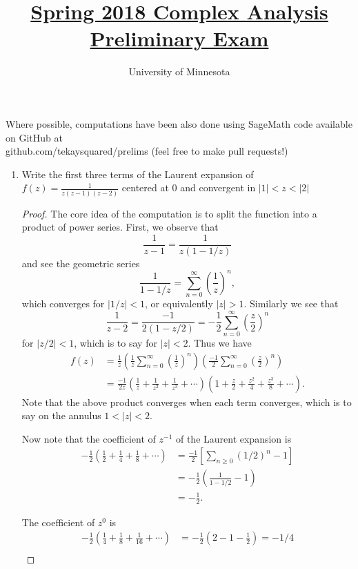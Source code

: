 \documentclass{article}
\title{\href{https://math.umn.edu/sites/math.umn.edu/files/exams/complexs18.pdf}{Spring 2018 Complex Analysis Preliminary Exam}}
\author{University of Minnesota}
\date{}
\begin{document}
\maketitle

Where possible, computations have been also done using SageMath code available on GitHub at \\ github.com/tekaysquared/prelims (feel free to make pull requests!)

\begin{enumerate}
	
	\item Write the first three terms of the Laurent expansion of $\displaystyle f(z) = \frac{1}{z(z-1)(z-2)}$ centered at $0$ and convergent in $|1| < z < |2|$
	
	\begin{proof}
		The core idea of the computation is to split the function into a product of power series.
		First, we observe that 
		\[ \frac{1}{z-1} = \frac{1}{z(1-1/z)}\] 
		and see the geometric series 
		\[ \frac{1}{1-1/z} = \sum_{n=0}^\infty \left( \frac{1}{z} \right)^n,\]
		which converges for $|1/z| < 1$, or equivalently $|z|>1$.
		Similarly we see that 
		\[ \frac{1}{z-2} = \frac{-1}{2(1-z/2)} = -\frac{1}{2} \sum_{n=0}^\infty \left ( \frac{z}{2} \right )^n \]
		for $|z/2| < 1$, which is to say for $|z|< 2$.
		Thus we have
		\begin{align*}
			f(z) &= \frac{1}{z} \left ( \frac{1}{z} \sum_{n=0}^\infty \left ( \frac{1}{z} \right )^n \right ) \left ( \frac{-1}{2} \sum_{n=0}^\infty \left( \frac{z}{2} \right)^n \right )\\
			&= \frac{-1}{2z} \left (\frac{1}{z} + \frac{1}{z^2} + \frac{1}{z^3} + \cdots  \right) \left ( 1 + \frac{z}{2}+\frac{z^2}{4}+\frac{z^3}{8}+\cdots \right ).
		\end{align*}
		Note that the above product converges when each term converges, which is to say on the annulus $1 < |z| < 2$.
	
		Now note that the coefficient of 	$z^{-1}$ of the Laurent expansion is 
		\begin{align*}
			- \frac{1}{2} \left ( \frac{1}{2} + \frac{1}{4} +\frac{1}{8} + \cdots \right ) &=  \frac{-1}{2} \left [ \sum_{n \geq 0} (1/2)^n - 1\right ] \\
			&= -\frac{1}{2} \left (\frac{1}{1-1/2} - 1 \right)\\
			&= -\frac{1}{2}.
		\end{align*}
		
		The coefficient of $z^{0}$ is 
		\begin{align*}
			-\frac{1}{2} \left ( \frac{1}{4} + \frac{1}{8} + \frac{1}{16} +\cdots \right ) 
			&= -\frac{1}{2} \left(2 - 1 - \frac{1}{2}\right) = -1/4 \\
		\end{align*} 
		

\end{proof}
\end{enumerate}
\end{document}
